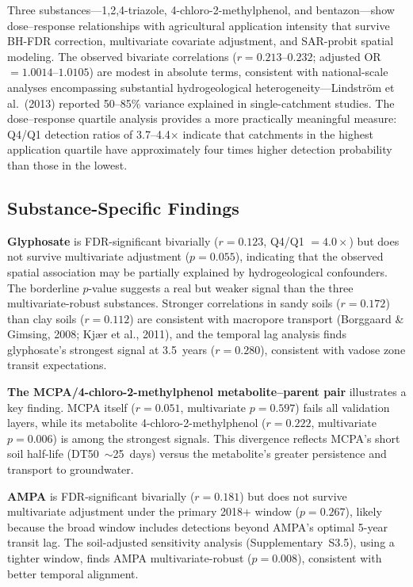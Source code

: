 \documentclass[12pt,a4paper]{article}
\begin{document}
Three substances---1,2,4-triazole, 4-chloro-2-methylphenol, and bentazon---show dose--response relationships with agricultural application intensity that survive BH-FDR correction, multivariate covariate adjustment, and SAR-probit spatial modeling. The observed bivariate correlations ($r = 0.213$--$0.232$; adjusted OR $= 1.0014$--$1.0105$) are modest in absolute terms, consistent with national-scale analyses encompassing substantial hydrogeological heterogeneity---Lindstr\"om et al.\ (2013) reported 50--85\% variance explained in single-catchment studies. The dose--response quartile analysis provides a more practically meaningful measure: Q4/Q1 detection ratios of 3.7--4.4$\times$ indicate that catchments in the highest application quartile have approximately four times higher detection probability than those in the lowest.

\subsection{Substance-Specific Findings}

\textbf{Glyphosate} is FDR-significant bivarially ($r = 0.123$, Q4/Q1 $= 4.0\times$) but does not survive multivariate adjustment ($p = 0.055$), indicating that the observed spatial association may be partially explained by hydrogeological confounders. The borderline $p$-value suggests a real but weaker signal than the three multivariate-robust substances. Stronger correlations in sandy soils ($r = 0.172$) than clay soils ($r = 0.112$) are consistent with macropore transport (Borggaard \& Gimsing, 2008; Kj\ae r et al., 2011), and the temporal lag analysis finds glyphosate's strongest signal at 3.5~years ($r = 0.280$), consistent with vadose zone transit expectations.

\textbf{The MCPA/4-chloro-2-methylphenol metabolite--parent pair} illustrates a key finding. MCPA itself ($r = 0.051$, multivariate $p = 0.597$) fails all validation layers, while its metabolite 4-chloro-2-methylphenol ($r = 0.222$, multivariate $p = 0.006$) is among the strongest signals. This divergence reflects MCPA's short soil half-life (DT50~$\sim$25~days) versus the metabolite's greater persistence and transport to groundwater.

\textbf{AMPA} is FDR-significant bivarially ($r = 0.181$) but does not survive multivariate adjustment under the primary 2018+ window ($p = 0.267$), likely because the broad window includes detections beyond AMPA's optimal 5-year transit lag. The soil-adjusted sensitivity analysis (Supplementary~S3.5), using a tighter window, finds AMPA multivariate-robust ($p = 0.008$), consistent with better temporal alignment.
\end{document}
